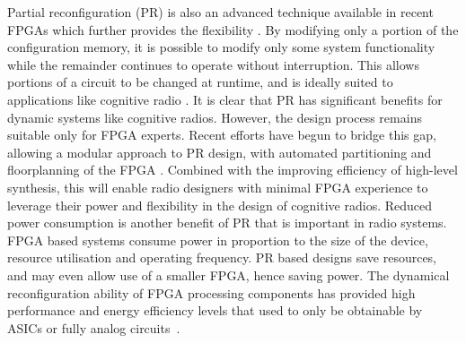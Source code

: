 Partial reconfiguration (PR) is also an advanced technique available in recent FPGAs which further provides the flexibility \cite{Sedcole2006,McDonald2008}.
By modifying only a portion of the configuration memory, it is possible to modify only some system functionality while the remainder continues to operate without interruption.
This allows portions of a circuit to be changed at runtime, and is ideally suited to applications like cognitive radio \cite{Delahaye2007,Delorme2008}.
It is clear that PR has significant benefits for dynamic systems like cognitive radios.
However, the design process remains suitable only for FPGA experts.
Recent efforts have begun to bridge this gap, allowing a modular approach to PR design, with automated partitioning and floorplanning of the FPGA \cite{Vipin2012,Vipin2013}.
Combined with the improving efficiency of high-level synthesis, this will enable radio designers with minimal FPGA experience to leverage their power and flexibility in the design of cognitive radios.
Reduced power consumption is another benefit of PR that is important in radio systems.
FPGA based systems consume power in proportion to the size of the device, resource utilisation and operating frequency.
PR based designs save resources, and may even allow use of a smaller FPGA, hence saving power.
The dynamical reconfiguration ability of FPGA processing components has provided high performance and energy efficiency levels that used to only be obtainable by ASICs or fully analog circuits~\cite{Dobson2014}.

